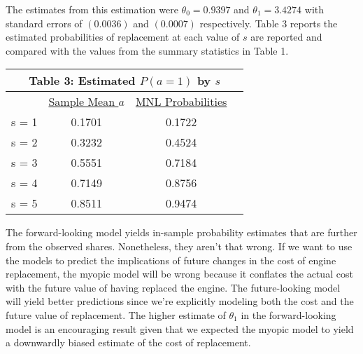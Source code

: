\documentclass[11pt]{article}
\begin{document}
The estimates from this estimation were $\theta_{0}=0.9397$ and $\theta_{1}=3.4274$ with standard errors of $(0.0036)$ and $(0.0007)$ respectively.  Table 3 reports the estimated probabilities of replacement at each value of $s$ are reported and compared with the values from the summary statistics in Table 1.  

\begin{center}
\begin{tabular}{lccc}
\hline\hline
\multicolumn{4}{c}{\textbf{Table 3: Estimated $P(a=1)$ by $s$}}, $\beta=0.95$\\
\hline
& \underline{Sample Mean $a$}  & \underline{MNL Probabilities} \\
s = 1 & 0.1701 & 0.1722 \\
s = 2 & 0.3232 &  0.4524 \\
s = 3 & 0.5551 &  0.7184 \\
s = 4 & 0.7149 &  0.8756 \\
s = 5 & 0.8511 &  0.9474\\
\hline\hline
\end {tabular}
\end{center}

The forward-looking model yields in-sample probability estimates that are further from the observed shares.  Nonetheless, they aren't that wrong.  If we want to use the models to predict the implications of future changes in the cost of engine replacement, the myopic model will be wrong because it conflates the actual cost with the future value of having replaced the engine.    The future-looking model will yield better predictions since we're explicitly modeling both the cost and the future value of replacement.  The higher estimate of $\theta_1$ in the forward-looking model is an encouraging result given that we expected the myopic model to yield a downwardly biased estimate of the cost of replacement.  
\end{document}
